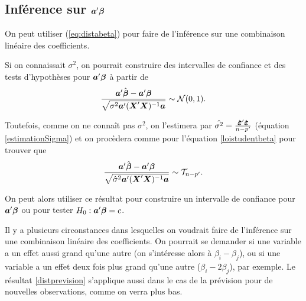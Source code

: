 
\subsection{Inférence sur  $\mbox{\boldmath$a$\unboldmath}'\mbox{\boldmath$\beta$}$ }
\label{sec:TestsDHypothèsetheta}


On peut utiliser (\ref{eq:distabeta}) pour faire de l'inférence sur une combinaison linéaire des coefficients.

Si on connaissait $\sigma^2$, on pourrait construire des intervalles de confiance et des tests d'hypothèses pour $\mbox{\boldmath$a$\unboldmath}'\mbox{\boldmath$\beta$}$ à partir de
\begin{eqnarray}
	\frac{\mbox{\boldmath$a$\unboldmath}'\hat{\mbox{\boldmath$\beta$}}-\mbox{\boldmath$a$\unboldmath}'\mbox{\boldmath$\beta$}}{\sqrt{\sigma^2\mbox{\boldmath$a$\unboldmath}'(\mbox{\boldmath$X$\unboldmath}'\mbox{\boldmath$X$\unboldmath})^{-1}\mbox{\boldmath$a$\unboldmath}}} \sim \mathcal{N}(0,1).
\end{eqnarray}

Toutefois, comme on ne connaît pas $\sigma^2$, on l'estimera par $\hat{\sigma^2}=\frac{\hat{\mbox{\boldmath$\varepsilon$\unboldmath}}'\hat{\mbox{\boldmath$\varepsilon$\unboldmath}}}{n-p'}$ (équation \ref{estimationSigma}) et on procèdera comme pour l'équation \ref{loistudentbeta} pour trouver que
\begin{eqnarray}
		\frac{\mbox{\boldmath$a$\unboldmath}'\hat{\mbox{\boldmath$\beta$}}-\mbox{\boldmath$a$\unboldmath}'\mbox{\boldmath$\beta$}}{\sqrt{\hat{\sigma}^2\mbox{\boldmath$a$\unboldmath}'(\mbox{\boldmath$X$\unboldmath}'\mbox{\boldmath$X$\unboldmath})^{-1}\mbox{\boldmath$a$\unboldmath}}} \sim \mathcal{T}_{n-p'}.
		\label{distprevision}
\end{eqnarray}

On peut alors utiliser ce résultat pour construire un intervalle de confiance pour $\mbox{\boldmath$a$\unboldmath}'\mbox{\boldmath$\beta$}$ ou pour tester $H_0: \mbox{\boldmath$a$\unboldmath}'\mbox{\boldmath$\beta$}=c$.

\begin{remarque}
Il y a plusieurs circonstances dans lesquelles on voudrait faire de l'inférence sur une combinaison linéaire des coefficients. On pourrait se demander si une variable a un effet aussi grand qu'une autre (on s'intéresse alors à $\beta_i - \beta_j$), ou si une variable a un effet deux fois plus grand qu'une autre ($\beta_i - 2\beta_j$), par exemple. Le résultat \ref{distprevision} s'applique aussi dans le cas de la prévision pour de nouvelles observations, comme on verra plus bas.
\end{remarque}


